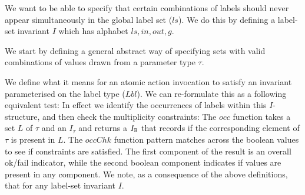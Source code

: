 We want to be able to specify that certain combinations
of labels should never appear simultaneously
in the global label set ($ls$).
We do this by defining a label-set invariant $I$
which has alphabet $ls,in,out,g$.

We start by defining a general abstract way of specifying
sets with valid combinations
of values drawn from a parameter type $\tau$.

We define what it means for an atomic action invocation
to satisfy an invariant parameterised on the label type ($Lbl$).
We can re-formulate this as a following equivalent test:
In effect we identify the occurrences of labels within this $I$-structure,
and then check the multiplicity constraints:
The $occ$ function takes a set $L$ of $\tau$ and an $I_\tau$ and returns a $I_{\mathbb{B}}$
that records if the corresponding element of $\tau$ is present in $L$.
The $occChk$ function pattern matches across the boolean values to see if
constraints are satisfied.
The first component of the result is an overall ok/fail indicator,
while the second boolean component indicates if values are present
in any component.
We note, as a consequence of the above definitions, that
for any label-set invariant $I$.

